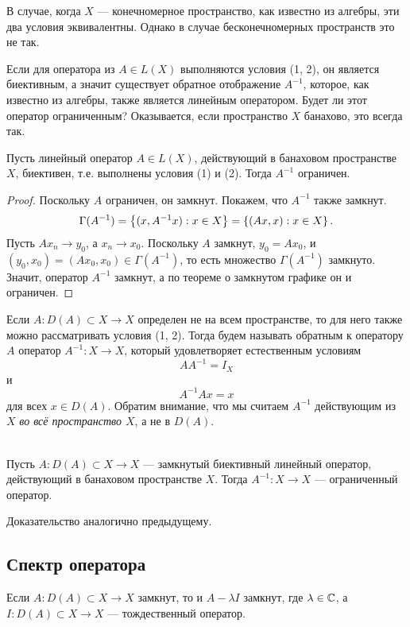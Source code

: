 В случае, когда $X$ --- конечномерное пространство, как известно из алгебры, эти два условия
эквивалентны. Однако в случае бесконечномерных пространств это не так.

Если для оператора из $A \in L(X)$ выполняются условия (1, 2), он является биективным,
а значит существует обратное отображение $A^{-1}$, которое, как известно из алгебры, также
является линейным оператором. Будет ли этот оператор ограниченным? Оказывается, если пространство
$X$ банахово, это всегда так.

\begin{theorem}
    Пусть линейный оператор $A \in L(X)$, действующий в банаховом пространстве $X$, биективен, т.е. 
    выполнены условия (1) и (2). Тогда $A^{-1}$ ограничен.
\end{theorem}

\begin{proof}
    Поскольку $A$ ограничен, он замкнут. Покажем, что $A^{-1}$ также замкнут.
    \[ \Gamma(A^{-1}) = \left\{(x, A^{-1}x) : x \in X\right\} = \left\{(Ax, x) : x \in X\right\}. \]
    Пусть $Ax_n \to y_0$, а $x_n \to x_0$. Поскольку $A$ замкнут, $y_0 = Ax_0$, и
    $(y_0, x_0) = (Ax_0, x_0) \in \Gamma(A^{-1})$, то есть множество $\Gamma(A^{-1})$ замкнуто.
    Значит, оператор $A^{-1}$ замкнут, а по теореме о замкнутом графике он и ограничен.
\end{proof}

Если $A \colon D(A) \subset X \to X$ определен не на всем пространстве, то для него также можно 
рассматривать условия (1, 2). Тогда будем называть обратным к оператору $A$ оператор 
$A^{-1} \colon X \to X$, который удовлетворяет естественным условиям
\[ AA^{-1} = I_X \]
и
\[ A^{-1}Ax = x \]
для всех $x \in D(A)$. 
Обратим внимание, что мы считаем $A^{-1}$ действующим из $X$ \emph{во всё пространство $X$}, 
а не в $D(A)$.

\begin{theorem}\hfill\\
    \indent Пусть $A \colon D(A) \subset X \to X$ --- замкнутый биективный линейный оператор, 
    действующий в банаховом пространстве $X$. Тогда $A^{-1} \colon X \to X$ --- ограниченный
    оператор. 
\end{theorem}

Доказательство аналогично предыдущему.

\subsection{Спектр оператора}
\begin{lemma}
    Если $A \colon D(A) \subset X \to X$ замкнут, то и $A - \lambda I$ замкнут, 
    где $\lambda \in \mathbb{C}$, а $I \colon D(A) \subset X \to X$ --- тождественный оператор.
\end{lemma}

